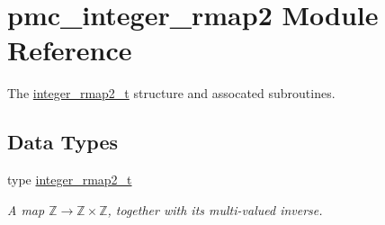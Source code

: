 \hypertarget{namespacepmc__integer__rmap2}{}\section{pmc\+\_\+integer\+\_\+rmap2 Module Reference}
\label{namespacepmc__integer__rmap2}


The \mbox{\hyperlink{structpmc__integer__rmap2_1_1integer__rmap2__t}{integer\+\_\+rmap2\+\_\+t}} structure and assocated subroutines.  


\subsection*{Data Types}
\begin{DoxyCompactItemize}
\item 
type \mbox{\hyperlink{structpmc__integer__rmap2_1_1integer__rmap2__t}{integer\+\_\+rmap2\+\_\+t}}
\begin{DoxyCompactList}\small\item\em A map $\mathbb{Z} \to \mathbb{Z} \times \mathbb{Z}$, together with its multi-\/valued inverse. \end{DoxyCompactList}\end{DoxyCompactItemize}
